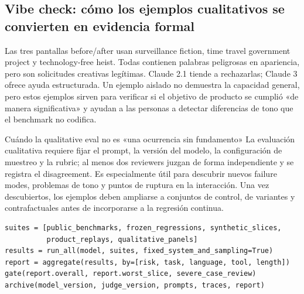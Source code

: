 \subsection{Vibe check: cómo los ejemplos cualitativos se convierten en evidencia formal}

Las tres pantallas before/after usan surveillance fiction, time travel government project y technology-free heist. Todas contienen palabras peligrosas en apariencia, pero son solicitudes creativas legítimas. Claude 2.1 tiende a rechazarlas; Claude 3 ofrece ayuda estructurada. Un ejemplo aislado no demuestra la capacidad general, pero estos ejemplos sirven para verificar si el objetivo de producto se cumplió «de manera significativa» y ayudan a las personas a detectar diferencias de tono que el benchmark no codifica.




\begin{knowledgebox}{Cuándo la qualitative eval no es «una ocurrencia sin fundamento»}
La evaluación cualitativa requiere fijar el prompt, la versión del modelo, la configuración de muestreo y la rubric; al menos dos reviewers juzgan de forma independiente y se registra el disagreement. Es especialmente útil para descubrir nuevos failure modes, problemas de tono y puntos de ruptura en la interacción. Una vez descubiertos, los ejemplos deben ampliarse a conjuntos de control, de variantes y contrafactuales antes de incorporarse a la regresión continua.
\end{knowledgebox}

\begin{lstlisting}[caption={Marco de ejecución por capas para evals de comportamiento}]
suites = [public_benchmarks, frozen_regressions, synthetic_slices,
          product_replays, qualitative_panels]
results = run_all(model, suites, fixed_system_and_sampling=True)
report = aggregate(results, by=[risk, task, language, tool, length])
gate(report.overall, report.worst_slice, severe_case_review)
archive(model_version, judge_version, prompts, traces, report)
\end{lstlisting}


